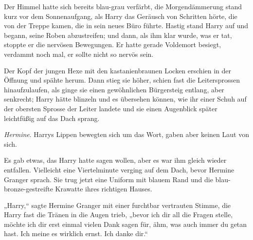 Der Himmel hatte sich bereits blau-grau verfärbt, die Morgendämmerung stand kurz vor dem Sonnenaufgang, als Harry das Geräusch von Schritten hörte, die von der Treppe kamen, die in sein neues Büro führte.
Hastig stand Harry auf und begann, seine Roben abzustreifen; und dann, als ihm klar wurde, was er tat, stoppte er die nervösen Bewegungen. Er hatte gerade Voldemort besiegt, verdammt noch mal, er sollte nicht so nervös sein.

Der Kopf der jungen Hexe mit den kastanienbraunen Locken erschien in der Öffnung und spähte herum. Dann stieg sie höher, schien fast die Leitersprossen hinaufzulaufen, als ginge sie einen gewöhnlichen Bürgersteig entlang, aber senkrecht; Harry hätte blinzeln und es übersehen können, wie ihr einer Schuh auf der obersten Sprosse der Leiter landete und sie einen Augenblick später leichtfüßig auf das Dach sprang.

\emph{Hermine}.
Harrys Lippen bewegten sich um das Wort, gaben aber keinen Laut von sich.

Es gab etwas, das Harry hatte sagen wollen, aber es war ihm gleich wieder entfallen. Vielleicht eine Viertelminute verging auf dem Dach, bevor Hermine Granger sprach. Sie trug jetzt eine Uniform mit blauem Rand und die blau-bronze-gestreifte Krawatte ihres richtigen Hauses.

„Harry,“ sagte Hermine Granger mit einer furchtbar vertrauten Stimme, die Harry fast die Tränen in die Augen trieb, „bevor ich dir all die Fragen stelle, möchte ich dir erst einmal vielen Dank sagen für, ähm, was auch immer du getan hast. Ich meine es wirklich ernst. Ich danke dir.“

